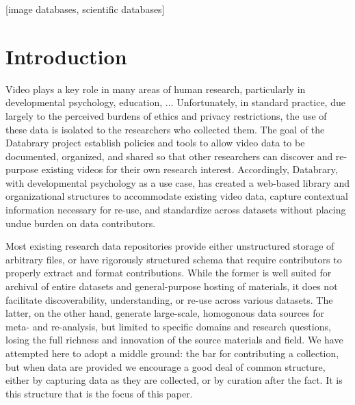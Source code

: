 \documentclass{sig-alternate}
\begin{document}
[image
databases, scientific databases]



\section{Introduction}

Video plays a key role in many areas of human research, particularly in developmental psychology, education, ...
Unfortunately, in standard practice, due largely to the perceived burdens of ethics and privacy restrictions, the use of these data is isolated to the researchers who collected them.
The goal of the Databrary project establish policies and tools to allow video data to be documented, organized, and shared so that other researchers can discover and re-purpose existing videos for their own research interest.
Accordingly, Databrary, with developmental psychology as a use case, has created a web-based library and organizational structures to accommodate existing video data, capture contextual information necessary for re-use, and standardize across datasets without placing undue burden on data contributors.

Most existing research data repositories provide either unstructured storage of arbitrary files, or have rigorously structured schema that require contributors to properly extract and format contributions.
While the former is well suited for archival of entire datasets and general-purpose hosting of materials, it does not facilitate discoverability, understanding, or re-use across various datasets.
The latter, on the other hand, generate large-scale, homogonous data sources for meta- and re-analysis, but limited to specific domains and research questions, losing the full richness and innovation of the source materials and field.
We have attempted here to adopt a middle ground: the bar for contributing a collection, but when data are provided we encourage a good deal of common structure, either by capturing data as they are collected, or by curation after the fact.
It is this structure that is the focus of this paper.
\end{document}
